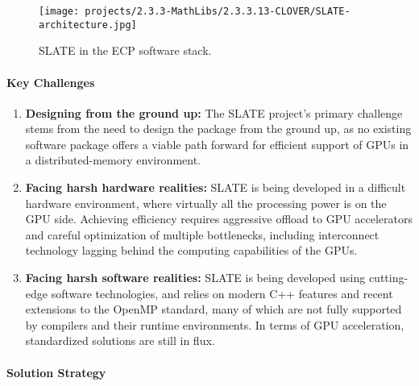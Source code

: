 \begin{figure}[htb]
    \centering
    \texttt{[image: projects/2.3.3-MathLibs/2.3.3.13-CLOVER/SLATE-architecture.jpg]}
    \caption{\label{fig:slate-architecture}
    SLATE in the ECP software stack.}
\end{figure}

\paragraph{Key  Challenges}

\begin{enumerate}

\item
\textbf{Designing from the ground up:}
The SLATE project's primary challenge stems from the need to design the package
from the ground up, as no existing software package offers
a viable path forward for efficient support of GPUs
in a distributed-memory environment.

\item
\textbf{Facing harsh hardware realities:}
SLATE is being developed in a difficult hardware environment, where virtually
all the processing power is on the GPU side.
Achieving efficiency requires aggressive offload to GPU accelerators
and careful optimization of multiple bottlenecks, including
interconnect technology lagging behind the computing
capabilities of the GPUs.

\item
\textbf{Facing harsh software realities:}
SLATE is being developed using cutting-edge software technologies,
and relies on modern C++ features and recent extensions
to the OpenMP standard, many of which are not fully supported by compilers
and their runtime environments.
In terms of GPU acceleration, standardized solutions are still in flux.

\end{enumerate}

\paragraph{Solution Strategy}

